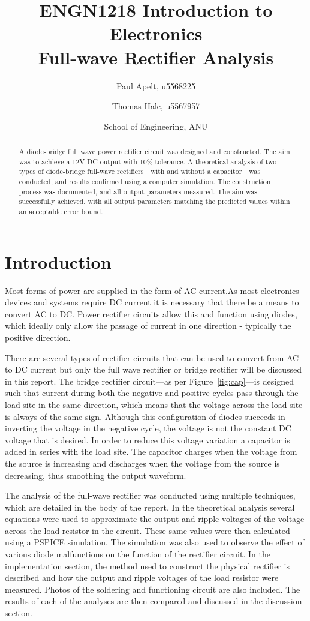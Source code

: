 \documentclass[12pt]{article}
\title{
ENGN1218 Introduction to Electronics\\
Full-wave Rectifier Analysis\\
}
\author{
\and Paul Apelt, u5568225
\and Thomas Hale, u5567957
\and School of Engineering, ANU 
}
\begin{document}
\maketitle

\begin{abstract}
A diode-bridge full wave power rectifier circuit was designed and constructed. The aim was to achieve a 12V DC output with 10\% tolerance. A theoretical analysis of two types of diode-bridge full-wave rectifiers---with and without a capacitor---was conducted, and results confirmed using a computer simulation. The construction process was documented, and all output parameters measured. The aim was successfully achieved, with all output parameters matching the predicted values within an acceptable error bound.
\end{abstract}

\section{Introduction}
\label{sec:int}
Most forms of power are supplied in the form of AC current.As most electronics devices and systems require DC current it is necessary that there be a means to convert AC to DC. Power rectifier circuits allow this and function using diodes, which ideally only allow the passage of current in one direction - typically the positive direction.

There are several types of rectifier circuits that can be used to convert from AC to DC current but only the full wave rectifier or bridge rectifier will be discussed in this report. The bridge rectifier circuit---as per Figure~\ref{fig:cap}---is designed such that current during both the negative and positive cycles pass through the load site in the same direction, which means that the voltage across the load site is always of the same sign. Although this configuration of diodes succeeds in inverting the voltage in the negative cycle, the voltage is not the constant DC voltage that is desired. In order to reduce this voltage variation a capacitor is added in series with the load site. The capacitor charges when the voltage from the source is increasing and discharges when the voltage from the source is decreasing, thus smoothing the output waveform. 

The analysis of the full-wave rectifier was conducted using multiple techniques, which are detailed in the body of the report. In the theoretical analysis several equations were used to approximate the output and ripple voltages of the voltage across the load resistor in the circuit. These same values were then calculated using a PSPICE simulation. The simulation was also used to observe the effect of various diode malfunctions on the function of the rectifier circuit. In the implementation section, the method used to construct the physical rectifier is described and how the output and ripple voltages of the load resistor were measured. Photos of the soldering and functioning circuit are also included. The results of each of the analyses are then compared and discussed in the discussion section.
\end{document}
